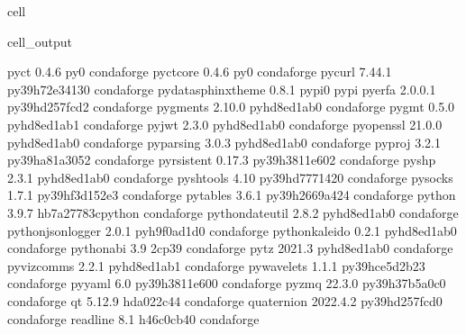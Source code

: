 \documentclass[letterpaper,table,10pt,english]{jupyterBook}
\begin{document}
\begin{sphinxuseclass}{cell}
\begin{sphinxVerbatimOutput}
\begin{sphinxuseclass}{cell_output}
\begin{sphinxVerbatim}[commandchars=\\\{\}]
pyct                      0.4.6                      py\PYGZus{}0    conda\PYGZhy{}forge
pyct\PYGZhy{}core                 0.4.6                      py\PYGZus{}0    conda\PYGZhy{}forge
pycurl                    7.44.1           py39h72e3413\PYGZus{}0    conda\PYGZhy{}forge
pydata\PYGZhy{}sphinx\PYGZhy{}theme       0.8.1                    pypi\PYGZus{}0    pypi
pyerfa                    2.0.0.1          py39hd257fcd\PYGZus{}2    conda\PYGZhy{}forge
pygments                  2.10.0             pyhd8ed1ab\PYGZus{}0    conda\PYGZhy{}forge
pygmt                     0.5.0              pyhd8ed1ab\PYGZus{}1    conda\PYGZhy{}forge
pyjwt                     2.3.0              pyhd8ed1ab\PYGZus{}0    conda\PYGZhy{}forge
pyopenssl                 21.0.0             pyhd8ed1ab\PYGZus{}0    conda\PYGZhy{}forge
pyparsing                 3.0.3              pyhd8ed1ab\PYGZus{}0    conda\PYGZhy{}forge
pyproj                    3.2.1            py39ha81a305\PYGZus{}2    conda\PYGZhy{}forge
pyrsistent                0.17.3           py39h3811e60\PYGZus{}2    conda\PYGZhy{}forge
pyshp                     2.3.1              pyhd8ed1ab\PYGZus{}0    conda\PYGZhy{}forge
pyshtools                 4.10             py39hd777142\PYGZus{}0    conda\PYGZhy{}forge
pysocks                   1.7.1            py39hf3d152e\PYGZus{}3    conda\PYGZhy{}forge
pytables                  3.6.1            py39h2669a42\PYGZus{}4    conda\PYGZhy{}forge
python                    3.9.7           hb7a2778\PYGZus{}3\PYGZus{}cpython    conda\PYGZhy{}forge
python\PYGZhy{}dateutil           2.8.2              pyhd8ed1ab\PYGZus{}0    conda\PYGZhy{}forge
python\PYGZhy{}json\PYGZhy{}logger        2.0.1              pyh9f0ad1d\PYGZus{}0    conda\PYGZhy{}forge
python\PYGZhy{}kaleido            0.2.1              pyhd8ed1ab\PYGZus{}0    conda\PYGZhy{}forge
python\PYGZus{}abi                3.9                      2\PYGZus{}cp39    conda\PYGZhy{}forge
pytz                      2021.3             pyhd8ed1ab\PYGZus{}0    conda\PYGZhy{}forge
pyviz\PYGZus{}comms               2.2.1              pyhd8ed1ab\PYGZus{}1    conda\PYGZhy{}forge
pywavelets                1.1.1            py39hce5d2b2\PYGZus{}3    conda\PYGZhy{}forge
pyyaml                    6.0              py39h3811e60\PYGZus{}0    conda\PYGZhy{}forge
pyzmq                     22.3.0           py39h37b5a0c\PYGZus{}0    conda\PYGZhy{}forge
qt                        5.12.9               hda022c4\PYGZus{}4    conda\PYGZhy{}forge
quaternion                2022.4.2         py39hd257fcd\PYGZus{}0    conda\PYGZhy{}forge
readline                  8.1                  h46c0cb4\PYGZus{}0    conda\PYGZhy{}forge

\end{sphinxVerbatim}
\end{sphinxuseclass}
\end{sphinxVerbatimOutput}
\end{sphinxuseclass}
\end{document}
